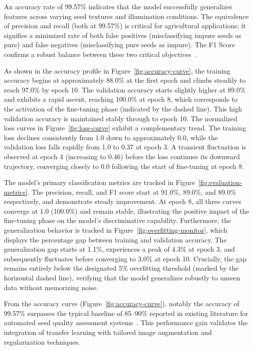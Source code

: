 An accuracy rate of 99.57\% indicates that the model successfully generalizes features across varying seed textures and illumination conditions. The equivalence of precision and recall (both at 99.57\%) is critical for agricultural applications; it signifies a minimized rate of both false positives (misclassifying impure seeds as pure) and false negatives (misclassifying pure seeds as impure). The F1 Score confirms a robust balance between these two critical objectives~\cite{mohanty2016}.

As shown in the accuracy profile in Figure~\ref{fig:accuracy-curve}, the training accuracy begins at approximately 88.0\% at the first epoch and climbs steadily to reach 97.0\% by epoch 10. The validation accuracy starts slightly higher at 89.0\% and exhibits a rapid ascent, reaching 100.0\% at epoch 8, which corresponds to the activation of the fine-tuning phase (indicated by the dashed line). This high validation accuracy is maintained stably through to epoch 10. The normalized loss curves in Figure~\ref{fig:loss-curve} exhibit a complementary trend. The training loss declines consistently from 1.0 down to approximately 0.0, while the validation loss falls rapidly from 1.0 to 0.37 at epoch 3. A transient fluctuation is observed at epoch 4 (increasing to 0.46) before the loss continues its downward trajectory, converging closely to 0.0 following the start of fine-tuning at epoch 8.

The model's primary classification metrics are tracked in Figure~\ref{fig:evaluation-metrics}. The precision, recall, and F1 score start at 91.0\%, 89.0\%, and 89.0\% respectively, and demonstrate steady improvement. At epoch 8, all three curves converge at 1.0 (100.0\%) and remain stable, illustrating the positive impact of the fine-tuning phase on the model's discriminative capability. Furthermore, the generalization behavior is tracked in Figure~\ref{fig:overfitting-monitor}, which displays the percentage gap between training and validation accuracy. The generalization gap starts at 1.1\%, experiences a peak of 4.3\% at epoch 3, and subsequently fluctuates before converging to 3.0\% at epoch 10. Crucially, the gap remains entirely below the designated 5\% overfitting threshold (marked by the horizontal dashed line), verifying that the model generalizes robustly to unseen data without memorizing noise.

From the accuracy curve (Figure~\ref{fig:accuracy-curve}), notably the accuracy of 99.57\% surpasses the typical baseline of 85--90\% reported in existing literature for automated seed quality assessment systems~\cite{dyrmann2016, ni2009}. This performance gain validates the integration of transfer learning with tailored image augmentation and regularization techniques.

